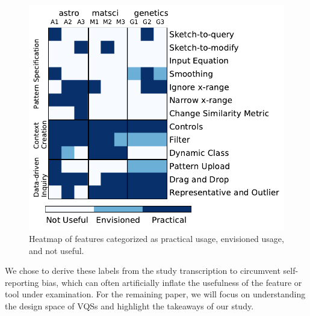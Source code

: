 \begin{figure}[h!]
  \includegraphics[width=0.8\linewidth]{figures/PENcoding.pdf}
  \caption{Heatmap of features categorized as practical usage, envisioned usage, and not useful. }
  \label{fig:feature_heatmap}
\end{figure}
We chose to derive these labels from the study transcription to circumvent self-reporting bias, which can often artificially inflate the usefulness of the feature or tool under examination. For the remaining paper, we will focus on understanding the design space of VQSs and highlight the takeaways of our study.%
